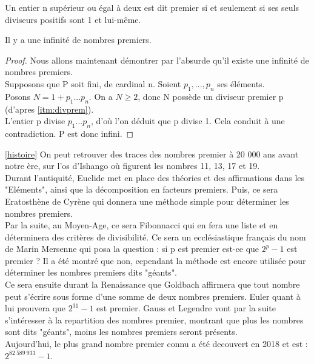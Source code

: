 \begin{definition}
\label{def:nb_prem}
Un entier n supérieur ou égal à deux est dit premier si et seulement si ses seuls diviseurs positifs sont 1 et lui-même.
\end{definition}

\begin{theorem} \label{thm:InfPre}
Il y a une infinité de nombres premiers.
\end{theorem}


\begin{proof}
Nous allons maintenant démontrer par l'absurde qu'il existe une infinité de nombres premiers. \\
Supposons que P soit fini, de cardinal n. Soient $p_1,...,p_n$ ses éléments. \\
Posons $N= 1 + p_1 ... p_n$. On a $N \geq 2$, donc N possède un diviseur premier p (d'apres \ref{itm:divprem}). \\
L'entier p divise $p_1 ... p_n$, d'où l'on déduit que p divise 1. Cela conduit à une contradiction. P est donc infini.
\end{proof}

\begin{history} \ref{histoire}
On peut retrouver des traces des nombres premier à 20 000 ans avant notre ère, sur l'os d'Ishango où figurent les nombres 11, 13, 17 et 19. \\
Durant l'antiquité, Euclide met en place des théories et des affirmations dans les "Eléments", ainsi que la décomposition en facteurs premiers. Puis, ce sera Eratosthène de Cyrène qui donnera une méthode simple pour déterminer les nombres premiers. \\
Par la suite, au Moyen-Age, ce sera Fibonnacci qui en fera une liste et en déterminera des critères de divisibilité. Ce sera un ecclésiastique français du nom de Marin Mersenne qui posa la question : si p est premier est-ce que $2^p - 1$ est premier ? Il a été montré que non, cependant la méthode est encore utilisée pour déterminer les nombres premiers dits "géants". \\
Ce sera ensuite durant la Renaissance que Goldbach affirmera que tout nombre peut s'écrire sous forme d'une somme de deux nombres premiers. Euler quant à lui prouvera que $2^{31} - 1$ est premier. Gauss et Legendre vont par la suite s'intéresser à la repartition des nombres premier, montrant que plus les nombres sont dits "géants", moins les nombres premiers seront présents. \\
Aujourd'hui, le plus grand nombre premier connu a été decouvert en 2018 et est : $2^{82 \ 589 \ 933} - 1$.
\end{history}
